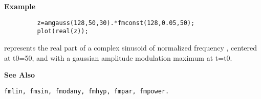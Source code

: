 {\bf \large {}\selectfont Example}\\
\hspace*{1.5cm}
\begin{minipage}[t]{13.5cm}
\begin{verbatim}
         z=amgauss(128,50,30).*fmconst(128,0.05,50);
         plot(real(z));
\end{verbatim}
represents the real part of a complex sinusoid of normalized frequency {}, centered at {\ty t0=50}, and with a gaussian amplitude modulation
maximum at {\ty t=t0}.
\end{minipage}
\vspace*{.5cm}


{\bf \large {}\selectfont See Also}\\
\hspace*{1.5cm}
\begin{minipage}[t]{13.5cm}
\begin{verbatim}
fmlin, fmsin, fmodany, fmhyp, fmpar, fmpower.
\end{verbatim}
\end{minipage}
